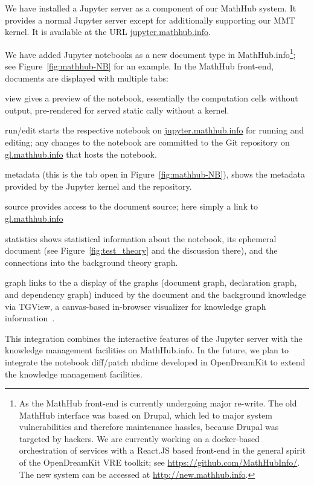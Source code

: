 We have installed a Jupyter server as a component of our MathHub system.
It provides a normal Jupyter server except for additionally supporting our MMT kernel.
It is available at the URL \url{jupyter.mathhub.info}.

We have added Jupyter notebooks as a new document type in MathHub.info\footnote{As the MathHub front-end is currently undergoing major re-write.
  The old MathHub interface was based on Drupal, which led to major system vulnerabilities and therefore maintenance hassles, because Drupal was targeted by hackers.
  We are currently working on a docker-based orchestration of services with a React.JS based front-end in the general spirit of the OpenDreamKit VRE toolkit; see \url{https://github.com/MathHubInfo/}. The new system can be accessed at \url{http://new.mathhub.info}.}; see Figure~\ref{fig:mathhub-NB} for an example. In the MathHub front-end, documents are displayed with multiple tabs:
\begin{compactenum}
\item \textsf{view} gives a preview of the notebook, essentially the computation cells without output, pre-rendered for served static cally without a kernel.
\item \textsf{run/edit} starts the respective notebook  on \url{jupyter.mathhub.info} for running and editing; any changes to the notebook are committed to the Git repository on  \url{gl.mathhub.info} that hosts the notebook. 
\item \textsf{metadata} (this is the tab open in Figure~\ref{fig:mathhub-NB}), shows the metadata provided by the Jupyter kernel and the repository. 
\item \textsf{source} provides access to the document source; here simply a link to \url{gl.mathhub.info}
\item \textsf{statistics} shows statistical information about the notebook, its ephemeral document (see Figure~\ref{fig:test_theory} and the discussion there), and the connections into the background theory graph. 
\item \textsf{graph} links to the a display of the graphs (document graph, declaration graph, and dependency graph) induced by the document and the background knowledge via TGView, a canvas-based in-browser visualizer for knowledge graph information~\cite{RupKohMue:fitgv17}.
\end{compactenum}
This integration combines the interactive features of the Jupyter server with the knowledge management facilities on MathHub.info. In the future, we plan to integrate the notebook diff/patch \textsf{nbdime} developed in OpenDreamKit to extend the knowledge management facilities. 

